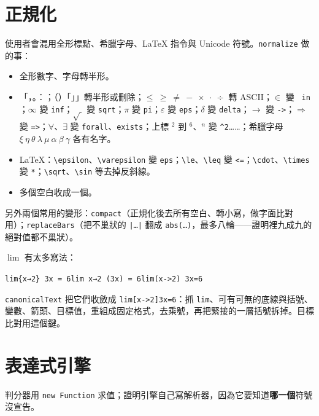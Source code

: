 \documentclass[11pt,a4paper,oneside]{book}
\renewcommand{\_}{\ifmmode\origunderscore\else\textunderscore\allowbreak\fi}
\newcommand{\code}[1]{\texttt{#1}}
\begin{document}
\chapter{正規化}
使用者會混用全形標點、希臘字母、LaTeX 指令與 Unicode 符號。\code{normalize} 做的事：
\begin{itemize}
  \item 全形數字、字母轉半形。
  \item 「，。：；（）「」」轉半形或刪除；$\le\ \ge\ \ne\ -\ \times\ \cdot\ \div$ 轉 ASCII；$\in$ 變 \code{ in }；$\infty$ 變 \code{inf}；$\sqrt{\ }$ 變 \code{sqrt}；$\pi$ 變 \code{pi}；$\varepsilon$ 變 \code{eps}；$\delta$ 變 \code{delta}；$\to$ 變 \code{->}；$\Rightarrow$ 變 \code{=>}；$\forall$、$\exists$ 變 \code{forall}、\code{exists}；上標 $^2$ 到 $^6$、$^n$ 變 \code{\string^2}……；希臘字母 $\xi\ \eta\ \theta\ \lambda\ \mu\ \alpha\ \beta\ \gamma$ 各有名字。
  \item LaTeX：\code{\textbackslash epsilon}、\code{\textbackslash varepsilon} 變 \code{eps}；\code{\textbackslash le}、\code{\textbackslash leq} 變 \code{<=}；\code{\textbackslash cdot}、\code{\textbackslash times} 變 \code{*}；\code{\textbackslash sqrt}、\code{\textbackslash sin} 等去掉反斜線。
  \item 多個空白收成一個。
\end{itemize}
另外兩個常用的變形：\code{compact}（正規化後去所有空白、轉小寫，做字面比對用）；\code{replaceBars}（把不巢狀的 \code{|…|} 翻成 \code{abs(…)}，最多八輪——證明裡九成九的絕對值都不巢狀）。

$\lim$ 有太多寫法：
\begin{center}
\code{lim\_\{x→2\} 3x = 6}\qquad \code{lim x→2 (3x) = 6}\qquad \code{lim\_(x->2) 3x=6}
\end{center}
\code{canonicalText} 把它們收斂成 \code{lim[x->2]3x=6}：抓 \code{lim}、可有可無的底線與括號、變數、箭頭、目標值，重組成固定格式，去乘號，再把緊接的一層括號拆掉。目標比對用這個鍵。

\chapter{表達式引擎}
判分器用 \code{new Function} 求值；證明引擎自己寫解析器，因為它要知道\textbf{哪一個}符號沒宣告。
\end{document}
